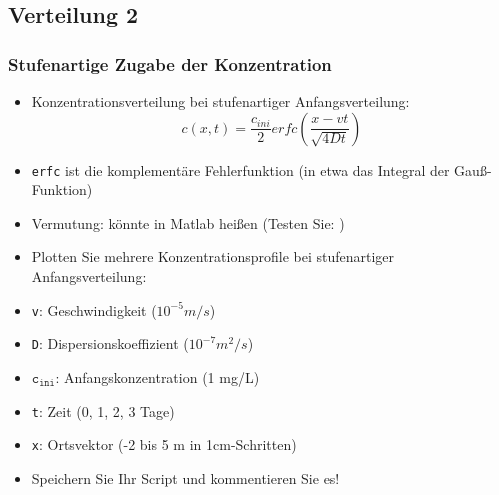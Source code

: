       \subsection{Verteilung 2}
      \begin{frame}
          \frametitle{Stufenartige Zugabe der Konzentration}
          \begin{itemize}
              \item Konzentrationsverteilung bei stufenartiger Anfangsverteilung:
              \begin{displaymath}
                  c(x,t) = \frac{c_{ini}}{2} erfc \left( \frac{x-vt}{\sqrt{4Dt}} \right)
              \end{displaymath}
              \item \texttt{erfc} ist die komplementäre Fehlerfunktion (in etwa das Integral der Gauß-Funktion)
              \item Vermutung: könnte in Matlab  heißen (Testen Sie: )
          \end{itemize}
      \end{frame}

      \secMexercise
      \begin{frame}
          \frameMexercise
          \begin{exercise}
              \sloppy
              \begin{itemize}
                  \item Plotten Sie mehrere Konzentrationsprofile bei stufenartiger Anfangsverteilung:
                  \item \texttt{v}: Geschwindigkeit ($10^{-5} m/s$)
                  \item \texttt{D}: Dispersionskoeffizient ($10^{-7} m^{2}/s$)
                  \item $\mathtt{c_{ini}}$: Anfangskonzentration (1 mg/L)
                  \item \texttt{t}: Zeit (0, 1, 2, 3 Tage)
                  \item \texttt{x}: Ortsvektor (-2 bis 5 m in 1cm-Schritten)
                  \item Speichern Sie Ihr Script und kommentieren Sie es!
              \end{itemize}
          \end{exercise}
      \end{frame}

